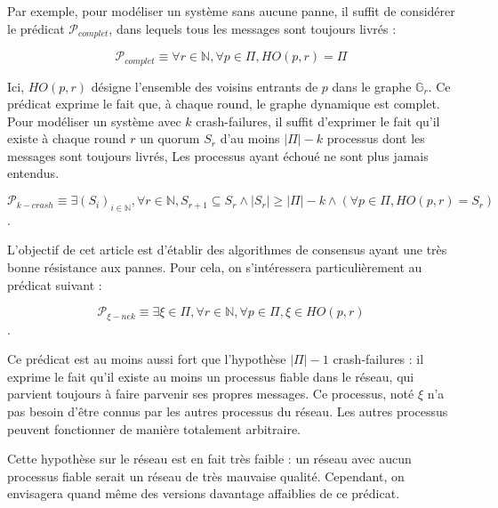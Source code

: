 \documentclass{article}
\begin{document}



Par exemple, pour modéliser un système sans aucune panne, il suffit de considérer le prédicat $\mathcal{P}_{complet}$, dans lequels tous les messages sont toujours livrés :

$$\mathcal{P}_{complet} \equiv \forall r \in \mathds{N}, \forall p \in \Pi, HO(p, r) = \Pi$$

Ici, $HO(p, r)$ désigne l'ensemble des voisins entrants de $p$ dans le graphe $\mathds{G}_r$.
Ce prédicat exprime le fait que, à chaque round, le graphe dynamique est complet.
Pour modéliser un système avec $k$ crash-failures, il suffit d'exprimer le fait qu'il existe à chaque round $r$ un quorum $S_r$ d'au moins $|\Pi| - k$ processus dont les messages sont toujours livrés,
Les processus ayant échoué ne sont plus jamais entendus.

$$\mathcal{P}_{k-crash} \equiv \exists (S_i)_{i \in \mathds{N}}, \forall r \in \mathds{N}, S_{r+1} \subseteq S_r \wedge |S_r| \geq |\Pi| - k \wedge (\forall p \in \Pi, HO(p, r) = S_r)$$.

L'objectif de cet article est d'établir des algorithmes de consensus ayant une très bonne résistance aux pannes. Pour cela, on s'intéressera particulièrement au prédicat suivant :

$$\mathcal{P}_{\xi-nek} \equiv \exists \xi \in \Pi, \forall r \in \mathds{N}, \forall p \in \Pi, \xi \in HO(p,r)$$.

Ce prédicat est au moins aussi fort que l'hypothèse $|\Pi| - 1$ crash-failures :
il exprime le fait qu'il existe au moins un processus fiable dans le réseau, qui parvient toujours à faire parvenir ses propres messages.
Ce processus, noté $\xi$ n'a pas besoin d'être connus par les autres processus du réseau.
Les autres processus peuvent fonctionner de manière totalement arbitraire.

Cette hypothèse sur le réseau est en fait très faible : un réseau avec aucun processus fiable serait un réseau de très mauvaise qualité. Cependant, on envisagera quand même des versions
davantage affaiblies de ce prédicat.
\end{document}
